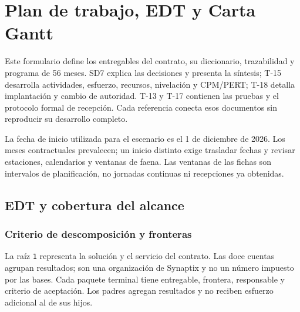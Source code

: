\chapter*{Plan de trabajo, EDT y Carta Gantt}
Este formulario define los entregables del contrato, su diccionario, trazabilidad y programa de 56 meses. SD7 explica las decisiones y presenta la síntesis; T-15 desarrolla actividades, esfuerzo, recursos, nivelación y CPM/PERT; T-18 detalla implantación y cambio de autoridad. T-13 y T-17 contienen las pruebas y el protocolo formal de recepción. Cada referencia conecta esos documentos sin reproducir su desarrollo completo.

La fecha de inicio utilizada para el escenario es el 1 de diciembre de 2026. Los meses contractuales prevalecen; un inicio distinto exige trasladar fechas y revisar estaciones, calendarios y ventanas de faena. Las ventanas de las fichas son intervalos de planificación, no jornadas continuas ni recepciones ya obtenidas.


\section{EDT y cobertura del alcance}\label{sec:t14-edt}
\subsection{Criterio de descomposición y fronteras}
La raíz \texttt{1} representa la solución y el servicio del contrato. Las doce cuentas agrupan resultados; son una organización de Synaptix y no un número impuesto por las bases. Cada paquete terminal tiene entregable, frontera, responsable y criterio de aceptación. Los padres agregan resultados y no reciben esfuerzo adicional al de sus hijos.

